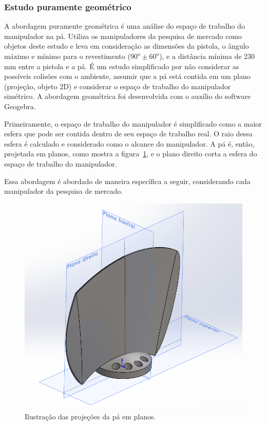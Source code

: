 \subsubsection{Estudo puramente geométrico}
A abordagem puramente geométrica é uma análise do espaço de trabalho do
manipulador na pá. Utiliza os manipuladores da pesquisa de mercado como
objetos deste estudo e leva em consideração as dimensões da
pistola, o ângulo máximo e mínimo para o revestimento ($90^o \pm 60^o$), e a
distância mínima de 230 mm entre a pistola e a pá. É um estudo simplificado por não considerar as possíveis colisões com o ambiente, assumir
que a pá está contida em um plano (projeção, objeto 2D) e considerar o espaço
de trabalho do manipulador simétrico. A abordagem geométrica foi desenvolvida
com o auxílio do software Geogebra.

Primeiramente, o espaço de trabalho do manipulador é simplificado
como a maior esfera que pode ser contida dentro de seu espaço de
trabalho real. O raio dessa esfera é calculado e considerado como o
alcance do manipulador. A pá é, então, projetada em planos, como mostra a
figura~\ref{fig::paplanos}, e o plano direito corta a esfera do espaço de
trabalho do manipulador. 

Essa abordagem é abordado de maneira específica a seguir, considerando cada
manipulador da pesquisa de mercado.

\begin{figure}[h!]	
	\includegraphics[width=\columnwidth]{figs/bighatch/PaPlanos.PNG}
	\caption{Ilustração das projeções da pá em planos.}
	\label{fig::paplanos}
\end{figure}

